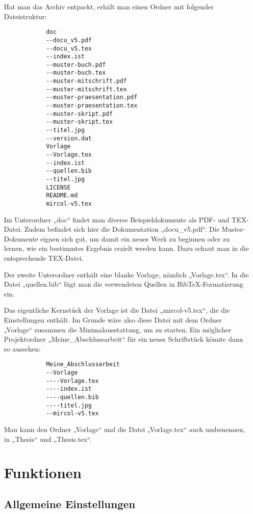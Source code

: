 			Hat man das Archiv entpackt, erhält man einen Ordner mit folgender Dateistruktur: 
			
			\begin{verbatim}
			doc
			--docu_v5.pdf
			--docu_v5.tex
			--index.ist
			--muster-buch.pdf
			--muster-buch.tex
			--muster-mitschrift.pdf
			--muster-mitschrift.tex
			--muster-praesentation.pdf
			--muster-praesentation.tex
			--muster-skript.pdf
			--muster-skript.tex
			--titel.jpg
			--version.dat
			Vorlage
			--Vorlage.tex
			--index.ist
			--quellen.bib
			--titel.jpg
			LICENSE
			README.md
			mircol-v5.tex
			\end{verbatim}
			
			Im Unterordner „doc“ findet man diverse Beispieldokumente als PDF- und TEX-Datei. Zudem befindet sich hier die Dokumentation „docu\_v5.pdf“. Die Muster-Dokumente eignen sich gut, um damit ein neues Werk zu beginnen oder zu lernen, wie ein bestimmtes Ergebnis erzielt werden kann. Dazu schaut man in die entsprechende TEX-Datei. 
			
			Der zweite Unterordner enthält eine blanke Vorlage, nämlich „Vorlage.tex“. In die Datei „quellen.bib“ fügt man die verwendeten Quellen in BibTeX-Formatierung ein. 
			
			Das eigentliche Kernstück der Vorlage ist die Datei „mircol-v5.tex“, die die Einstellungen enthält. Im Grunde wäre also diese Datei mit dem Ordner „Vorlage“ zusammen die Minimalausstattung, um zu starten. Ein möglicher Projektordner „Meine\_Abschlussarbeit“ für ein neues Schriftstück könnte dann so aussehen: 
			
			\newpage
			
			\begin{verbatim}
			Meine_Abschlussarbeit
			--Vorlage
			----Vorlage.tex
			----index.ist
			----quellen.bib
			----titel.jpg
			--mircol-v5.tex
			\end{verbatim}
			
			Man kann den Ordner „Vorlage“ und die Datei „Vorlage.tex“ auch umbenennen, \zb in „Thesis“ und „Thesis.tex“. 

	\chapter{Funktionen}
		
		\section{Allgemeine Einstellungen}
		
